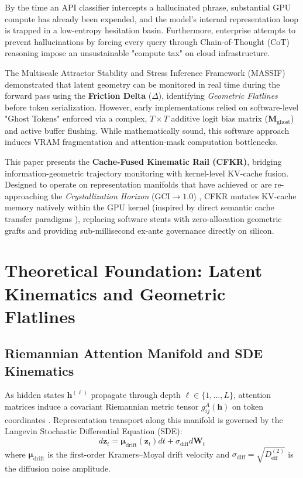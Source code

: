 \documentclass[11pt,twocolumn]{article}
\begin{document}
By the time an API classifier intercepts a hallucinated phrase, substantial GPU compute has already been expended, and the model's internal representation loop is trapped in a low-entropy hesitation basin. Furthermore, enterprise attempts to prevent hallucinations by forcing every query through Chain-of-Thought (CoT) reasoning impose an unsustainable "compute tax" on cloud infrastructure.

The Multiscale Attractor Stability and Stress Inference Framework (MASSIF) \cite{massif} demonstrated that latent geometry can be monitored in real time during the forward pass using the \textbf{Friction Delta} ($\Delta$), identifying \textit{Geometric Flatlines} before token serialization. However, early implementations relied on software-level "Ghost Tokens" enforced via a complex, $T \times T$ additive logit bias matrix ($\mathbf{M}_{\text{ghost}}$) and active buffer flushing. While mathematically sound, this software approach induces VRAM fragmentation and attention-mask computation bottlenecks.

This paper presents the \textbf{Cache-Fused Kinematic Rail (CFKR)}, bridging information-geometric trajectory monitoring with kernel-level KV-cache fusion. Designed to operate on representation manifolds that have achieved or are re-approaching the \textit{Crystallization Horizon} ($\text{GCI} \to 1.0$) \cite{solis2026gci}, CFKR mutates KV-cache memory natively within the GPU kernel (inspired by direct semantic cache transfer paradigms \cite{fu2025cache}), replacing software stents with zero-allocation geometric grafts and providing sub-millisecond ex-ante governance directly on silicon.

\section{Theoretical Foundation: Latent Kinematics and Geometric Flatlines}

\subsection{Riemannian Attention Manifold and SDE Kinematics}
As hidden states $\mathbf{h}^{(\ell)}$ propagate through depth $\ell \in \{1, \dots, L\}$, attention matrices induce a covariant Riemannian metric tensor $g_{ij}^A(\mathbf{h})$ on token coordinates \cite{amari2016information, nielsen2020riemannian}. Representation transport along this manifold is governed by the Langevin Stochastic Differential Equation (SDE):
\begin{equation}
d\mathbf{z}_t = \boldsymbol{\mu}_{\text{drift}}(\mathbf{z}_t) dt + \sigma_{\text{diff}} d\mathbf{W}_t
\end{equation}
where $\boldsymbol{\mu}_{\text{drift}}$ is the first-order Kramers--Moyal drift velocity and $\sigma_{\text{diff}} = \sqrt{D^{(2)}_{\text{eff}}}$ is the diffusion noise amplitude.
\end{document}
